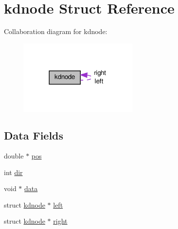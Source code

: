 \hypertarget{a00009}{\section{kdnode \-Struct \-Reference}
\label{da/da0/a00009}
}


\-Collaboration diagram for kdnode\-:
\nopagebreak
\begin{figure}[H]
\begin{center}
\leavevmode
\includegraphics[width=168pt]{d8/d41/a00038}
\end{center}
\end{figure}
\subsection*{\-Data \-Fields}
\begin{DoxyCompactItemize}
\item 
double $\ast$ \hyperlink{a00009_a1a6076b5177bd7af0d55bc0e8c21fde3_a1a6076b5177bd7af0d55bc0e8c21fde3}{pos}
\item 
int \hyperlink{a00009_a851cf68c8f607573c1a5e987784c83f6_a851cf68c8f607573c1a5e987784c83f6}{dir}
\item 
void $\ast$ \hyperlink{a00009_a735984d41155bc1032e09bece8f8d66d_a735984d41155bc1032e09bece8f8d66d}{data}
\item 
struct \hyperlink{a00009}{kdnode} $\ast$ \hyperlink{a00009_a77fe629b496db8e95613fa6520af4371_a77fe629b496db8e95613fa6520af4371}{left}
\item 
struct \hyperlink{a00009}{kdnode} $\ast$ \hyperlink{a00009_ad73ae7970017da6a7f7fafc2e889bb51_ad73ae7970017da6a7f7fafc2e889bb51}{right}
\end{DoxyCompactItemize}


